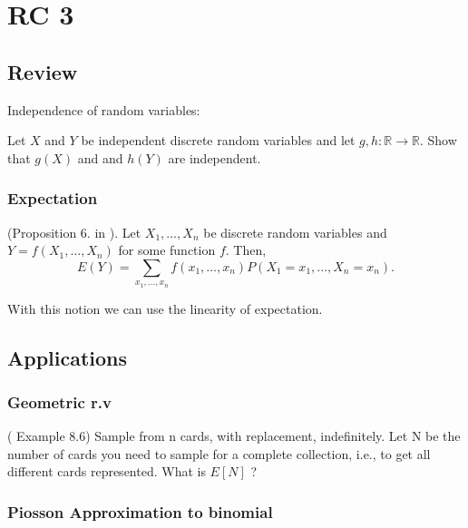 \chapter{RC 3}

\section{Review}
Independence of random variables: 
\begin{exercise}
   Let \(X\) and \(Y\) be independent discrete random variables and let \(g, h:\mathbb{R} \to \mathbb{R}\). Show that \(g(X)\) and and \(h(Y)\) are independent. 
\end{exercise}

\subsection{Expectation}
\begin{theorem*}
   (Proposition 6. in \cite{Und_Chatterjee}). Let \(X_1,\dots , X_n\) be discrete random variables and 
   \(Y =f(X_1,\dots, X_n) \) for some function \(f\). Then,
   \[
    E(Y) = \sum_{x_1,\dots,x_n}f(x_1,\dots,x_n) P(X_1 = x_1, \dots, X_n = x_n).
   \] 
\end{theorem*}
With this notion we can use the linearity of expectation.

\section{Applications}
\subsection{Geometric r.v}
\begin{eg}
    (\cite{Gravner2021} Example 8.6)
Sample from n cards, with replacement,
    indefinitely. Let N be the number of cards you need to sample for a complete collection, i.e., to
    get all different cards represented. What is \(E[N]\) ?
\end{eg}
\subsection{Piosson Approximation to binomial}

